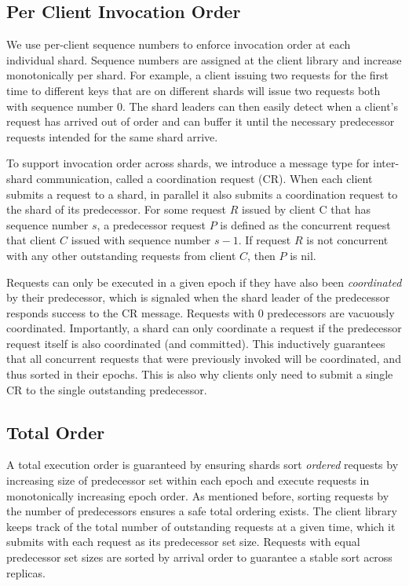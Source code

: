 \subsection{Per Client Invocation Order}

We use per-client sequence numbers to enforce invocation order at each individual shard. Sequence numbers are assigned at the client library 
and increase monotonically per shard. For example, a client issuing two requests for the first time to different keys that are on different shards will issue two requests both with sequence number 0. The shard leaders can then easily detect when a client's request
has arrived out of order and can buffer it until the necessary predecessor requests intended for the same shard arrive.

To support invocation order across shards, we introduce a message type for inter-shard communication, called a coordination request (CR). 
When each client submits a request to a shard, in parallel it also submits a coordination request to 
the shard of its predecessor. For some request $R$ issued by client C that has sequence number $s$, a predecessor request $P$ is defined as 
the concurrent request that client $C$ issued with sequence number $s-1$. If request $R$ is not concurrent with any other outstanding requests from client $C$, then $P$ is nil.

Requests can only be executed in a given epoch if they have also been \textit{coordinated} by their predecessor, which is signaled when the shard leader of the predecessor responds success to the CR message. Requests with 0 predecessors are vacuously coordinated. Importantly, a shard can only coordinate
a request if the predecessor request itself is also coordinated (and committed). This inductively guarantees that all concurrent requests that were previously invoked
will be coordinated, and thus sorted in their epochs. This is also why clients only need to submit a single CR to the single outstanding predecessor.


\subsection{Total Order}
A total execution order is guaranteed by ensuring shards sort \textit{ordered} requests by increasing size of predecessor set within each epoch and execute requests in monotonically increasing epoch order. As mentioned before, sorting requests by the number of predecessors ensures a safe total ordering exists. The client library keeps track of the total number of outstanding requests at a given time, which it submits with each request as its predecessor set size. Requests with equal predecessor set sizes are sorted by arrival order to guarantee a stable sort across replicas.

